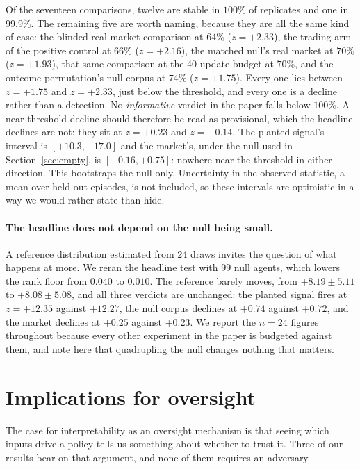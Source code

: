\documentclass[10pt,twocolumn]{article}
\begin{document}
Of the seventeen comparisons, twelve are stable in $100\%$ of replicates and
one in $99.9\%$. The remaining five are worth naming, because they are all the
same kind of case: the blinded-real market comparison at $64\%$ ($z=+2.33$), the
trading arm of the positive control at $66\%$ ($z=+2.16$), the matched null's
real market at $70\%$ ($z=+1.93$), that same comparison at the 40-update budget
at $70\%$, and the outcome permutation's null corpus at $74\%$ ($z=+1.75$).
Every one lies between $z=+1.75$ and $z=+2.33$, just below the threshold, and
every one is a decline rather than a detection. No \emph{informative} verdict in
the paper falls below $100\%$. A near-threshold decline should therefore be read
as provisional, which the headline declines are not: they sit at $z=+0.23$ and
$z=-0.14$. The planted signal's interval is $[+10.3, +17.0]$ and the market's,
under the null used in Section~\ref{sec:empty}, is $[-0.16, +0.75]$: nowhere
near the threshold in either direction. This bootstraps the null only. Uncertainty in the
observed statistic, a mean over held-out episodes, is not included, so these
intervals are optimistic in a way we would rather state than hide.

\paragraph{The headline does not depend on the null being small.}
A reference distribution estimated from 24 draws invites the question of what
happens at more. We reran the headline test with 99 null agents, which lowers
the rank floor from $0.040$ to $0.010$. The reference barely moves, from
$+8.19 \pm 5.11$ to $+8.08 \pm 5.08$, and all three verdicts are unchanged: the
planted signal fires at $z=+12.35$ against $+12.27$, the null corpus declines at
$+0.74$ against $+0.72$, and the market declines at $+0.25$ against $+0.23$. We
report the $n=24$ figures throughout because every other experiment in the paper
is budgeted against them, and note here that quadrupling the null changes
nothing that matters.

\section{Implications for oversight}

\label{sec:oversight}

The case for interpretability as an oversight mechanism is that seeing which
inputs drive a policy tells us something about whether to trust it. Three of
our results bear on that argument, and none of them requires an adversary.
\end{document}
